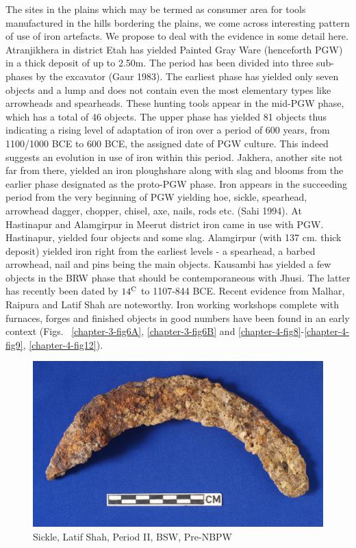 The sites in the plains which may be termed as consumer area for tools manufactured in the hills bordering the plains, we come across interesting pattern of use of iron artefacts. We propose to deal with the evidence in some detail here. Atranjikhera in district Etah has yielded Painted Gray Ware (henceforth PGW) in a thick deposit of up to 2.50m. The period has been divided into three sub-phases by the excavator (Gaur 1983). The earliest phase has yielded only seven objects and a lump and does not contain even the most elementary types like arrowheads and spearheads. These hunting tools appear in the mid-PGW phase, which has a total of 46 objects. The upper phase has yielded 81 objects thus indicating a rising level of adaptation of iron over a period of 600 years, from 1100/1000 BCE to 600 BCE, the assigned date of PGW culture. This indeed suggests an evolution in use of iron within this period. Jakhera, another site not far from there, yielded an iron ploughshare along with slag and blooms from the earlier phase designated as the proto-PGW phase. Iron appears in the succeeding period from the very beginning of PGW yielding hoe, sickle, spearhead, arrowhead dagger, chopper, chisel, axe, nails, rods etc. (Sahi 1994). At Hastinapur and Alamgirpur in Meerut district iron came in use with PGW. Hastinapur, yielded four objects and some slag. Alamgirpur (with 137 cm. thick deposit) yielded iron right from the earliest levels - a spearhead, a barbed arrowhead, nail and pins being the main objects. Kausambi has yielded a few objects in the BRW phase that should be contemporaneous with Jhusi. The latter has recently been dated by $14^{\rm C}$ to 1107-844 BCE. Recent evidence from Malhar, Raipura and Latif Shah are noteworthy. Iron working workshops complete with furnaces, forges and finished objects in good numbers have been found in an early context (Figs.~ \ref{chapter-3-fig6A}, \ref{chapter-3-fig6B} and \ref{chapter-4-fig8}-\ref{chapter-4-fig9}, \ref{chapter-4-fig12}).

\begin{figure}[H]
\includegraphics[scale=0.75]{images/chapter-4/fig011.jpg}
\caption{Sickle, Latif Shah, Period II, BSW, Pre-NBPW}\label{chapter-4-fig11}
\end{figure}

